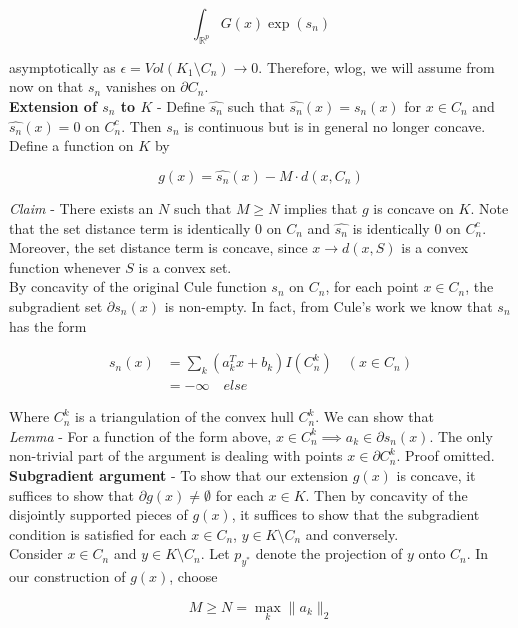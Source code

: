 \documentclass[11pt,reqno]{amsart}
\theoremstyle{definition}
\numberwithin{equation}{section}
\newcommand{\eps}{\epsilon}
\newcommand{\wh}{\widehat}
\newcommand{\mr}{\mathbb{R}}
\newcommand{\tb}{\textbf}
\newcommand{\pa}{\partial}
\begin{document}
\[
\int_{\mr^p} G(x) \exp(s_n) 
\]

asymptotically as $\eps = Vol(K_1 \setminus C_n) \to 0$. Therefore, wlog, we will assume from now on that $s_n$ vanishes on $\pa C_n$. \\

\tb{Extension of $s_n$ to $K$} - Define $\wh{s_n}$ such that $\wh{s_n}(x) = s_n(x)$ for $x \in C_n$ and $\wh{s_n}(x) = 0$ on $C_n^c$. Then $s_n$ is continuous but is in general no longer concave. Define a function on $K$ by 

\[
g(x) = \wh{s_n}(x) - M \cdot d(x,C_n) 
\]

\emph{Claim} - There exists an $N$ such that $M \geq N$ implies that $g$ is concave on $K$. Note that the set distance term is identically $0$ on $C_n$ and $\wh{s_n}$ is identically $0$ on $C_n^c$. Moreover, the set distance term is concave, since $x \to d(x,S)$ is a convex function whenever $S$ is a convex set. \\

By concavity of the original Cule function $s_n$ on $C_n$, for each point $x \in C_n$, the subgradient set $\pa s_n(x)$ is non-empty. In fact, from Cule's work we know that $s_n$ has the form 

\begin{align*}
s_n(x) &= \sum_k (a_k^T x + b_k) I(C_n^k) \quad (x \in C_n) \\
&= - \infty \quad else
\end{align*}

Where $C_n^k$ is a triangulation of the convex hull $C_n^k$. We can show that \\

\emph{Lemma} - For a function of the form above, $x \in C_n^k \implies a_k \in \pa s_n(x)$. The only non-trivial part of the argument is dealing with points $x \in \pa C_n^k$. Proof omitted. \\

\tb{Subgradient argument} - To show that our extension $g(x)$ is concave, it suffices to show that $\pa g(x) \not = \emptyset$ for each $x \in K$. Then by concavity of the disjointly supported pieces of $g(x)$, it suffices to show that the subgradient condition is satisfied for each $x \in C_n$, $y \in K \setminus C_n$ and conversely. \\

Consider $x \in C_n$ and $y \in K \setminus C_n$. Let $p_{y^*}$ denote the projection of $y$ onto $C_n$. In our construction of $g(x)$, choose 

\[
M \geq N = \max_{k} \|a_k\|_2 
\]
\end{document}
